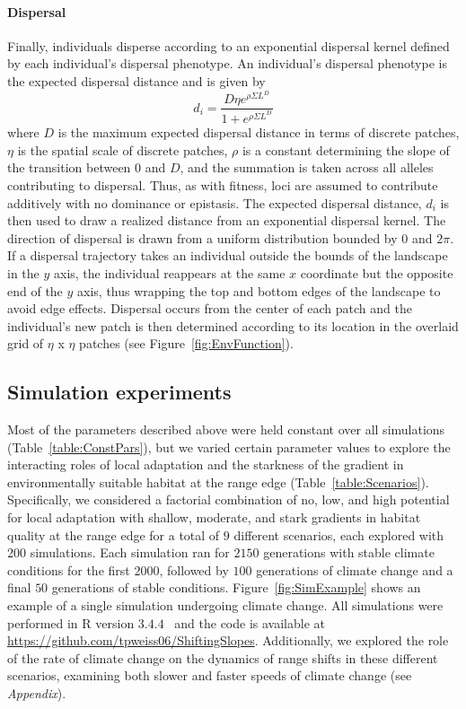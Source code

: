 \documentclass[11pt, oneside]{article}
\begin{document}
\paragraph{Dispersal}
Finally, individuals disperse according to an exponential dispersal kernel defined by each individual's dispersal phenotype. An individual's dispersal phenotype is the expected dispersal distance and is given by
\begin{equation}
d_{i} = \frac{D\eta e^{\rho\Sigma L^{D}}}{1+e^{\rho\Sigma L^{D}}} 
\end{equation}
where $D$ is the maximum expected dispersal distance in terms of discrete patches, $\eta$ is the spatial scale of discrete patches, $\rho$ is a constant determining the slope of the transition between $0$ and $D$, and the summation is taken across all alleles contributing to dispersal. Thus, as with fitness, loci are assumed to contribute additively with no dominance or epistasis. The expected dispersal distance, $d_{i}$ is then used to draw a realized distance from an exponential dispersal kernel. The direction of dispersal is drawn from a uniform distribution bounded by $0$ and $2\pi$. If a dispersal trajectory takes an individual outside the bounds of the landscape in the $y$ axis, the individual reappears at the same $x$ coordinate but the opposite end of the $y$ axis, thus wrapping the top and bottom edges of the landscape to avoid edge effects. Dispersal occurs from the center of each patch and the individual's new patch is then determined according to its location in the overlaid grid of $\eta$ x $\eta$ patches (see Figure~\ref{fig:EnvFunction}).

\subsection{Simulation experiments}
Most of the parameters described above were held constant over all simulations (Table~\ref{table:ConstPars}), but we varied certain parameter values to explore the interacting roles of local adaptation and the starkness of the gradient in environmentally suitable habitat at the range edge (Table~\ref{table:Scenarios}). Specifically, we considered a factorial combination of no, low, and high potential for local adaptation with shallow, moderate, and stark gradients in habitat quality at the range edge for a total of $9$ different scenarios, each explored with 200 simulations. Each simulation ran for $2150$ generations with stable climate conditions for the first $2000$, followed by $100$ generations of climate change and a final $50$ generations of stable conditions. Figure~\ref{fig:SimExample} shows an example of a single simulation undergoing climate change. All simulations were performed in R version $3.4.4$~\citep{team2000r} and the code is available at \url{https://github.com/tpweiss06/ShiftingSlopes}. Additionally, we explored the role of the rate of climate change on the dynamics of range shifts in these different scenarios, examining both slower and faster speeds of climate change (see \textit{Appendix}).
\end{document}
